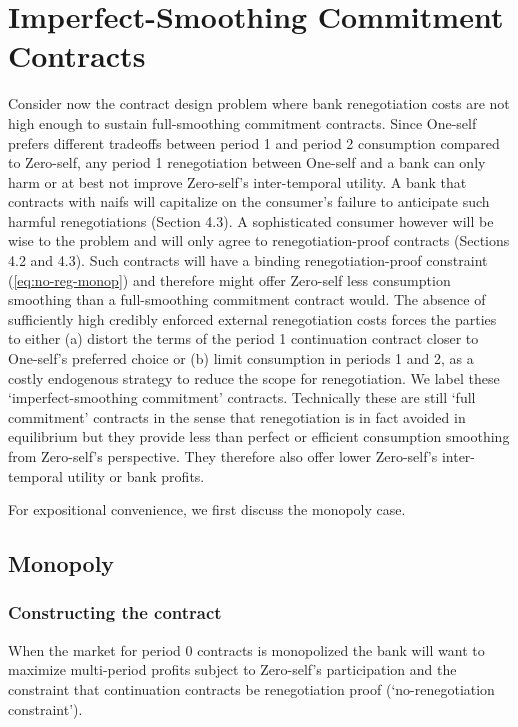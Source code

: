 \documentclass[11pt,english]{article}
\theoremstyle{plain}
\theoremstyle{definition}
\begin{document}
\section{Imperfect-Smoothing Commitment Contracts }

\label{sec:imperfectK}

Consider now the contract design problem where bank renegotiation
costs are not high enough to sustain full-smoothing commitment contracts.
Since One-self prefers different tradeoffs between period 1 and period
2 consumption compared to Zero-self, any period 1 renegotiation between
One-self and a bank can only harm \textendash{} or at best not improve
\textendash{} Zero-self's inter-temporal utility. A bank that contracts
with naifs will capitalize on the consumer's failure to anticipate
such harmful renegotiations (Section 4.3). A sophisticated consumer
however will be wise to the problem and will only agree to renegotiation-proof
contracts (Sections 4.2 and 4.3). Such contracts will have a binding
renegotiation-proof constraint (\ref{eq:no-reg-monop}) and therefore
might offer Zero-self less consumption smoothing than a full-smoothing
commitment contract would. The absence of sufficiently high credibly
enforced external renegotiation costs forces the parties to either
(a) distort the terms of the period 1 continuation contract closer
to One-self's preferred choice or (b) limit consumption in periods
1 and 2, as a costly endogenous strategy to reduce the scope for renegotiation.
We label these `imperfect-smoothing commitment' contracts. Technically
these are still `full commitment' contracts in the sense that renegotiation
is in fact avoided in equilibrium but they provide less than perfect
or efficient consumption smoothing from Zero-self's perspective. They
therefore also offer lower Zero-self's inter-temporal utility or bank
profits.

For expositional convenience, we first discuss the monopoly case.

\subsection{Monopoly}

\subsubsection{Constructing the contract}

When the market for period 0 contracts is monopolized the bank will
want to maximize multi-period profits subject to Zero-self's participation
and the constraint that continuation contracts be renegotiation proof
(`no-renegotiation constraint').
\end{document}
